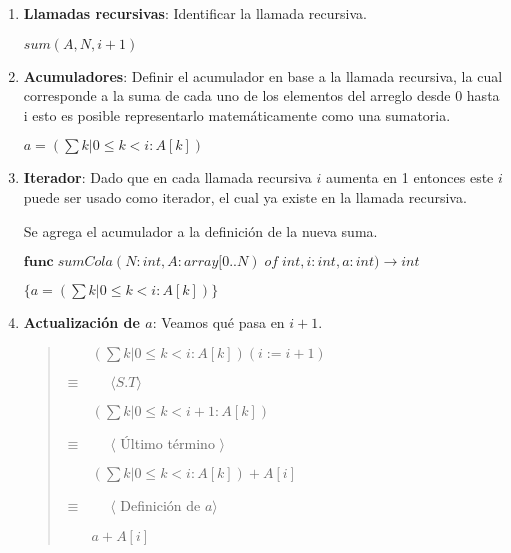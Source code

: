 \documentclass[hidelinks]{article}
\newenvironment{absolutelynopagebreak}
{\Needspace{10\baselineskip}\begin{quote}}
		{\end{quote}}
\begin{document}
\begin{enumerate}
	\item \textbf{Llamadas recursivas}: Identificar la llamada recursiva.\par
	      $sum(A, N, i + 1)$\par
	\item \textbf{Acumuladores}: Definir el acumulador en base a la llamada recursiva, la cual
	      corresponde a la suma de cada uno de los elementos del arreglo desde 0 hasta i
	      esto es posible representarlo matemáticamente como una sumatoria.\par
	      $a = (\sum k | 0 \leq k < i:A[k])$\par
	\item \textbf{Iterador}: Dado que en cada llamada recursiva $i$ aumenta en 1 entonces este $i$
	      puede ser usado como iterador, el cual ya existe en la llamada recursiva.\par
	      Se agrega el acumulador a la definición de la nueva suma.\par

	      $\textbf{func} \; sumCola(N: int, A: array[0..N) \; of \; int, i: int, a: int) \rightarrow int$ \par
	      $\{a = (\sum k | 0 \leq k < i:A[k])\}$ \par

	\item \textbf{Actualización de $a$}: Veamos qué pasa en $i+1$.\par
	      \begin{absolutelynopagebreak}
		      $\qquad (\sum k | 0 \leq k < i:A[k])(i := i + 1)$\par
		      $\equiv \qquad \langle S.T \rangle$\par
		      $\qquad (\sum k | 0 \leq k < i + 1:A[k])$\par
		      $\equiv \qquad \langle$ Último término $\rangle$\par
		      $\qquad (\sum k | 0 \leq k < i:A[k]) + A[i]$\par
		      $\equiv \qquad \langle$ Definición de $a\rangle$\par
		      $\qquad a + A[i]$\par
	      \end{absolutelynopagebreak}


\end{enumerate}
\end{document}
